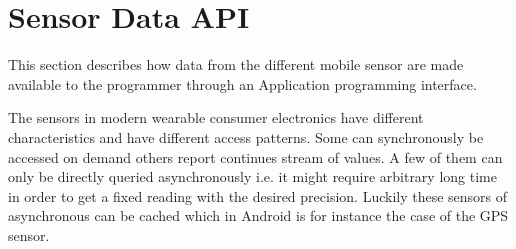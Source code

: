 
\section{Sensor Data API}
\label{sec:sensor_data_api}

This section describes how data from the different mobile sensor are made available to the programmer through an Application programming interface. 

The sensors in modern wearable consumer electronics have different characteristics and have different access patterns. Some can synchronously be accessed on demand others report continues stream of values. A few of them can only be directly queried asynchronously i.e. it might require arbitrary long time in order to get a fixed reading with the desired precision. Luckily these sensors of asynchronous can be cached which in Android is for instance the case of the GPS sensor.   